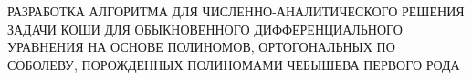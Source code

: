  \begin{center}
 {\large

РАЗРАБОТКА АЛГОРИТМА ДЛЯ ЧИСЛЕННО-АНАЛИТИЧЕСКОГО РЕШЕНИЯ ЗАДАЧИ КОШИ 
ДЛЯ ОБЫКНОВЕННОГО ДИФФЕРЕНЦИАЛЬНОГО УРАВНЕНИЯ НА ОСНОВЕ ПОЛИНОМОВ, 
ОРТОГОНАЛЬНЫХ ПО СОБОЛЕВУ, ПОРОЖДЕННЫХ ПОЛИНОМАМИ ЧЕБЫШЕВА ПЕРВОГО РОДА
%
 } \\[12pt]
\end{center}
